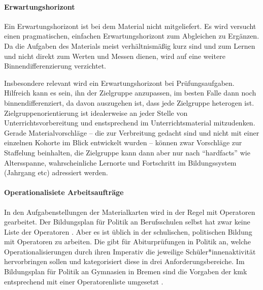 \paragraph{Erwartungshorizont}
Ein Erwartungshorizont ist bei dem Material nicht mitgeliefert.
Es wird versucht einen pragmatischen, einfachen Erwartungshorizont zum Abgleichen zu Ergänzen. Da die Aufgaben des Materials meist verhältnismäßig kurz sind und zum Lernen und nicht direkt zum Werten und Messen dienen, wird auf eine weitere Binnendifferenzierung verzichtet. 

Insbesondere relevant wird ein Erwartungshorizont bei Prüfungsaufgaben. Hilfreich kann es sein, ihn der Zielgruppe anzupassen, im besten Falle dann noch binnendifferenziert, da davon auszugehen ist, dass jede Zielgruppe heterogen ist.
Zielgruppenorientierung ist idealerweise an jeder Stelle von Unterrichtsvorbereitung und enstsprechend im Unterrichtsmaterial mitzudenken. 
Gerade Materialvorschläge -- die zur Verbreitung gedacht sind und nicht mit einer einzelnen Kohorte im Blick entwickelt wurden -- können zwar Vorschläge zur Staffelung beinhalten, die Zielgruppe kann dann aber nur nach \enquote{hardfacts} wie Altersspanne, wahrscheinliche Lernorte und Fortschritt im Bildungssystem (Jahrgang \gls{etc}) adressiert werden. 



\paragraph{Operationalisiete Arbeitsaufträge}
In den Aufgabenstellungen der Materialkarten wird in der Regel mit Operatoren gearbeitet. Der Bildungsplan für Politik an Berufsschulen selbst hat zwar keine Liste der Operatoren \autocite{bplan}. Aber es ist üblich in der schulischen, politischen Bildung mit Operatoren zu arbeiten. Die \textcite[14-18]{KMK.2005} gibt für Abiturprüfungen in Politik an, welche Operationalisierungen durch ihren Imperativ die jeweilige Schüler*innenaktivität hervorbringen sollen und kategorisiert diese in drei Anforderungsbereiche. Im Bildungsplan für Politik an Gymnasien in Bremen sind die Vorgaben der \gls{kmk} entsprechend mit einer Operatorenliste umgesetzt \autocite[13-14]{lower2008}.



